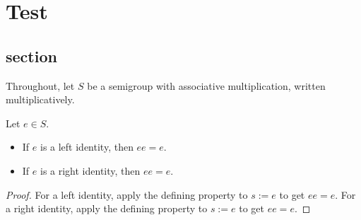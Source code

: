%

\chapter {Test}

\section{section}

Throughout, let \(S\) be a semigroup with associative multiplication, written multiplicatively.


\begin{lemma}
\leanok
\label{lem:test-lem}
Let \(e\in S\).
\begin{itemize}
  \item If \(e\) is a left identity, then \(e e = e\).
  \item If \(e\) is a right identity, then \(e e = e\).
\end{itemize}
\uses{}
\lean {}
\end{lemma}
\begin{proof}
For a left identity, apply the defining property to \(s:=e\) to get \(e e = e\).
For a right identity, apply the defining property to \(s:=e\) to get \(e e = e\).
\end{proof}
